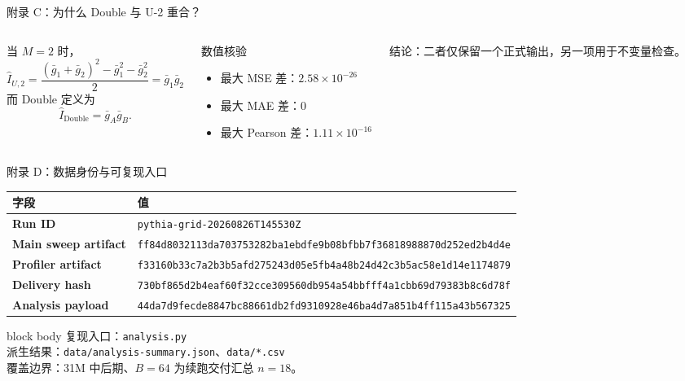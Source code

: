 \documentclass[10pt,aspectratio=169]{beamer}
\begin{document}
\begin{frame}{附录 C：为什么 Double 与 U-2 重合？}
  \begin{columns}[T,onlytextwidth]
      当 $M=2$ 时，
      \[
        \widehat I_{U,2}
        =\frac{(\bar g_1+\bar g_2)^2-\bar g_1^2-\bar g_2^2}{2}
        =\bar g_1\bar g_2
      \]
      而 Double 定义为
      \[
        \widehat I_{\mathrm{Double}}=\bar g_A\bar g_B.
      \]
      \begin{block}{数值核验}
        \begin{itemize}
          \item 最大 MSE 差：$2.58{\times}10^{-26}$
          \item 最大 MAE 差：0
          \item 最大 Pearson 差：$1.11{\times}10^{-16}$
        \end{itemize}
      \end{block}
      {\small 结论：二者仅保留一个正式输出，另一项用于不变量检查。}
  \end{columns}
\end{frame}

\begin{frame}{附录 D：数据身份与可复现入口}
  \scriptsize
  \begin{tabularx}{\textwidth}{>{\bfseries}p{3.0cm}X}
    \toprule
    字段 & 值 \\
    \midrule
    Run ID & \texttt{pythia-grid-20260826T145530Z} \\
    Main sweep artifact &
      \texttt{ff84d8032113da703753282ba1ebdfe9b08bfbb7f36818988870d252ed2b4d4e} \\
    Profiler artifact &
      \texttt{f33160b33c7a2b3b5afd275243d05e5fb4a48b24d42c3b5ac58e1d14e1174879} \\
    Delivery hash &
      \texttt{730bf865d2b4eaf60f32cce309560db954a54bbfff4a1cbb69d79383b8c6d78f} \\
    Analysis payload &
      \texttt{44da7d9fecde8847bc88661db2fd9310928e46ba4d7a851b4ff115a43b567325} \\
    \bottomrule
  \end{tabularx}
  \vspace{3mm}
  \begin{beamercolorbox}[rounded=true,sep=.6em]{block body}
    复现入口：\texttt{analysis.py}\\
    派生结果：\texttt{data/analysis-summary.json}、\texttt{data/*.csv}\\
    覆盖边界：31M 中后期、$B=64$ 为续跑交付汇总 $n=18$。
  \end{beamercolorbox}
\end{frame}
\end{document}
